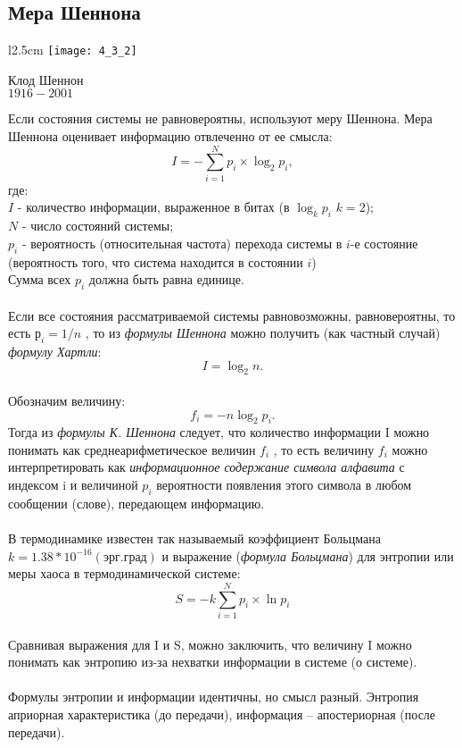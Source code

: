 \subsection{Мера Шеннона }
\begin{wrapfigure}[12]{l}{2.5cm}
\texttt{[image: 4\_3\_2]}
\begin{center}
\footnotesize{Клод Шеннон}
\\\footnotesize{$1916 - 2001$}
\end{center}
\end{wrapfigure}

Если состояния системы не равновероятны, используют меру Шеннона. Мера Шеннона оценивает информацию отвлеченно от ее смысла:
$$I = - \sum^{N}_{i=1}p_{i}\times \log_{2}p_{i},$$ где:
\\$I$ - количество информации, выраженное в битах (в $\log_{k}p_{i}$ $k = 2$);
\\$N$ - число состояний системы;
\\$p_{i}$ - вероятность (относительная частота) перехода системы в $i$-е состояние (вероятность того, что система находится в состоянии $i$) \\Сумма всех $p_{i}$ должна быть равна единице.\\
\\Если все состояния рассматриваемой системы равновозможны, равновероятны, то есть $р_i = 1/n$ , то из \emph{формулы Шеннона} можно получить (как частный случай) \emph{формулу Хартли}:
$$I = \log_{2}n.$$
\\Обозначим величину:
$$f_i = -n\log_{2}p_i.$$
\newpage
Тогда из \emph{формулы К. Шеннона} следует, что количество информации I можно понимать как среднеарифметическое величин $f_i$ , то есть величину $f_i$ можно интерпретировать как \emph{информационное содержание символа алфавита} с индексом i и величиной $p_i$ вероятности появления этого символа в любом сообщении (слове), передающем информацию.\\
\\ В термодинамике известен так называемый коэффициент Больцмана $k = 1.38 * 10^{-16} (эрг.град)$ и выражение (\emph{формула Больцмана}) для энтропии или меры хаоса в термодинамической системе:
$$ S = -k \sum^{N}_{i=1}p_{i}\times \ln{p_{i}}$$
\\ Сравнивая выражения для I и S, можно заключить, что величину I можно понимать как энтропию из-за нехватки информации в системе (о системе).\\
\\Формулы энтропии и информации идентичны, но смысл разный. Энтропия априорная характеристика (до передачи), информация – апостериорная (после передачи).\\
